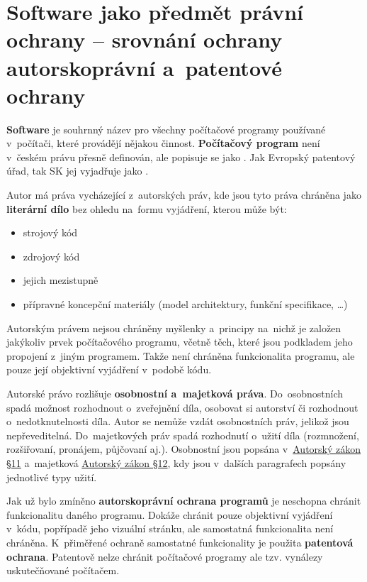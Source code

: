 \section{Software jako předmět právní ochrany -- srovnání ochrany autorskoprávní a~patentové ochrany}

\textbf{Software} je souhrnný název pro všechny počítačové programy používané v~počítači, které provádějí nějakou činnost. \textbf{Počítačový program} není v~českém právu přesně definován, ale popisuje se jako .
Jak Evropský patentový úřad, tak SK jej vyjadřuje jako .

Autor má práva vycházející z~autorských práv, kde jsou tyto práva chráněna jako \textbf{literární dílo} bez ohledu na~formu vyjádření, kterou může být:

\begin{itemize}
	\item strojový kód
	\item zdrojový kód
	\item jejich mezistupně
	\item přípravné koncepční materiály (model architektury, funkční specifikace, \dots)
\end{itemize}

Autorským právem nejsou chráněny myšlenky a~principy na~nichž je založen jakýkoliv prvek počítačového programu, včetně těch, které jsou podkladem jeho propojení z~jiným programem. Takže není chráněna funkcionalita programu, ale pouze její objektivní vyjádření v~podobě kódu.

Autorské právo rozlišuje \textbf{osobnostní a~majetková práva}. Do~osobnostních spadá možnost rozhodnout o~zveřejnění díla, osobovat si autorství či rozhodnout o~nedotknutelnosti díla. Autor se nemůže vzdát osobnostních práv, jelikož jsou nepřeveditelná. Do~majetkových práv spadá rozhodnutí o~užití díla (rozmnožení, rozšiřovaní, pronájem, půjčovaní aj.). Osobnostní jsou popsána v~\href{https://www.zakonyprolidi.cz/cs/2000-121#p11}{Autorský zákon §11} a~majetková \href{https://www.zakonyprolidi.cz/cs/2000-121#p12}{Autorský zákon §12}, kdy jsou v~dalších paragrafech popsány jednotlivé typy užití.

Jak už bylo zmíněno \textbf{autorskoprávní ochrana programů} je neschopna chránit funkcionalitu daného programu. Dokáže chránit pouze objektivní vyjádření v~kódu, popřípadě jeho vizuální stránku, ale samostatná funkcionalita není chráněna. K~přiměřené ochraně samostatné funkcionality je použita \textbf{patentová ochrana}. Patentově nelze chránit počítačové programy ale tzv. vynálezy uskutečňované počítačem.

